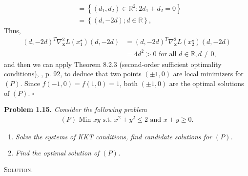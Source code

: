 \documentclass[a4paper]{article}
\numberwithin{equation}{section}
\begin{document}
\begin{enumerate}
\begin{align}
& = \left\{ {\left( {{d_1},{d_2}} \right) \in {\mathbb{R}^2};2{d_1} + {d_2} = 0} \right\}\\
& = \left\{ {\left( {d, - 2d} \right);d \in \mathbb{R}} \right\},
\end{align}
Thus, 
\begin{align}
{\left( {d, - 2d} \right)^T}\nabla _\mathbf{x}^2L\left( {x_1^\star } \right)\left( {d, - 2d} \right) &= {\left( {d, - 2d} \right)^T}\nabla _\mathbf{x}^2L\left( {x_2^\star } \right)\left( {d, - 2d} \right)\\
& = 4{d^2} > 0 \mbox{ for all } d\in \mathbb{R}, d \ne 0 ,
\end{align}
and then we can apply Theorem 8.2.3 (second-order sufficient optimality conditions), \cite{2}, p. 92, to deduce that two points $\left(\pm 1,0\right)$ are local minimizers for $\left(P\right)$. Since $f\left(-1,0\right)=f\left(1,0\right)=1$, both $\left(\pm 1,0\right)$ are the optimal solutions of $\left(P\right)$. \hfill $\square$
\end{enumerate}
\textbf{Problem 1.15.} \textit{Consider the following problem}
\begin{align}
\left( P \right)\mbox{ Min } xy \mbox{ s.t. }{x^2} + {y^2} \le 2\mbox{ and } x + y \ge 0.
\end{align}
\begin{enumerate}
\item \textit{Solve the systems of KKT conditions, find candidate solutions for $\left(P\right)$.}
\item \textit{Find the optimal solution of $\left(P\right)$.}
\end{enumerate}
\textsc{Solution.}
\end{document}
